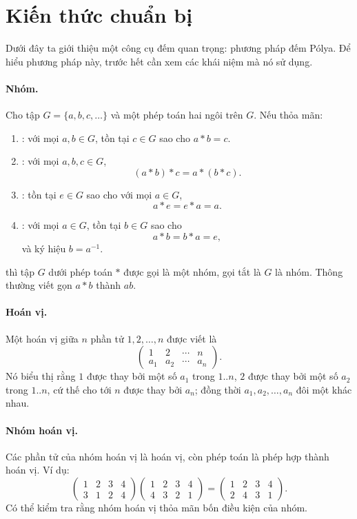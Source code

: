 \documentclass[11pt]{article}
\begin{document}
\section{Kiến thức chuẩn bị}

Dưới đây ta giới thiệu một công cụ đếm quan trọng: phương pháp đếm Pólya. Để
hiểu phương pháp này, trước hết cần xem các khái niệm mà nó sử dụng.

\paragraph{Nhóm.}
Cho tập \(G=\{a,b,c,\ldots\}\) và một phép toán hai ngôi trên \(G\). Nếu thỏa
mãn:
\begin{enumerate}[label=(\alph*)]
  \item {}: với mọi \(a,b\in G\), tồn tại \(c\in G\) sao cho
  \(a*b=c\).
  \item {}: với mọi \(a,b,c\in G\),
  \[
    (a*b)*c=a*(b*c).
  \]
  \item {}: tồn tại \(e\in G\) sao cho với mọi \(a\in G\),
  \[
    a*e=e*a=a.
  \]
  \item {}: với mọi \(a\in G\), tồn tại \(b\in G\) sao
  cho
  \[
    a*b=b*a=e,
  \]
  và ký hiệu \(b=a^{-1}\).
\end{enumerate}
thì tập \(G\) dưới phép toán \(*\) được gọi là một nhóm, gọi tắt là \(G\) là
nhóm. Thông thường viết gọn \(a*b\) thành \(ab\).

\paragraph{Hoán vị.}
Một hoán vị giữa \(n\) phần tử \(1,2,\ldots,n\) được viết là
\[
  \begin{pmatrix}
    1 & 2 & \cdots & n\\
    a_1 & a_2 & \cdots & a_n
  \end{pmatrix}.
\]
Nó biểu thị rằng \(1\) được thay bởi một số \(a_1\) trong \(1..n\), \(2\) được
thay bởi một số \(a_2\) trong \(1..n\), cứ thế cho tới \(n\) được thay bởi
\(a_n\); đồng thời \(a_1,a_2,\ldots,a_n\) đôi một khác nhau.

\paragraph{Nhóm hoán vị.}
Các phần tử của nhóm hoán vị là hoán vị, còn phép toán là phép hợp thành hoán
vị. Ví dụ:
\[
  \begin{pmatrix}
    1&2&3&4\\
    3&1&2&4
  \end{pmatrix}
  \begin{pmatrix}
    1&2&3&4\\
    4&3&2&1
  \end{pmatrix}
  =
  \begin{pmatrix}
    1&2&3&4\\
    2&4&3&1
  \end{pmatrix}.
\]
Có thể kiểm tra rằng nhóm hoán vị thỏa mãn bốn điều kiện của nhóm.
\end{document}
